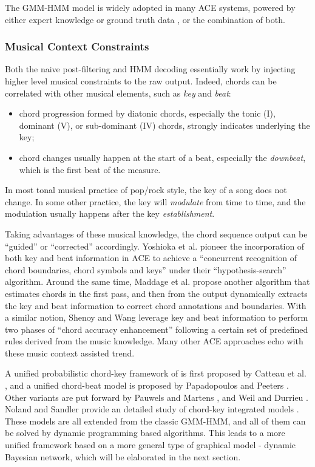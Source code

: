 The GMM-HMM model is widely adopted in many ACE systems, powered by either expert knowledge \cite{bello2005robust,weil2008hmm,cannam2013mirex} or ground truth data \cite{ellis20072007,lee2008acoustic,weil2009automatic,khadkevich2009use,mauch2008discrete,reed2009minimum,cho2009real}, or the combination of both.

\subsubsection{Musical Context Constraints}
Both the naive post-filtering and HMM decoding essentially work by injecting higher level musical constraints to the raw output. Indeed, chords can be correlated with other musical elements, such as {\it key} and {\it beat}:
\begin{itemize}
\item chord progression formed by diatonic chords, especially the tonic (I), dominant (V), or sub-dominant (IV) chords, strongly indicates underlying the key;
\item chord changes usually happen at the start of a beat, especially the {\it downbeat}, which is the first beat of the measure.
\end{itemize}
In most tonal musical practice of pop/rock style, the key of a song does not change. In some other practice, the key will {\it modulate} from time to time, and the modulation usually happens after the key {\it establishment}.

Taking advantages of these musical knowledge, the chord sequence output can be ``guided'' or ``corrected'' accordingly. Yoshioka et al. \cite{yoshioka2004automatic} pioneer the incorporation of both key and beat information in ACE to achieve a ``concurrent recognition of chord boundaries, chord symbols and keys'' under their ``hypothesis-search'' algorithm. Around the same time, Maddage et al. \cite{maddage2004content} propose another algorithm that estimates chords in the first pass, and then from the output dynamically extracts the key and beat information to correct chord annotations and boundaries. With a similar notion, Shenoy and Wang \cite{shenoy2005key} leverage key and beat information to perform two phases of ``chord accuracy enhancement'' following a certain set of predefined rules derived from the music knowledge. Many other ACE approaches \cite{lee2008acoustic,zenz2007automatic,sumi2008automatic,reinhard2008enhancing,khadkevich2011time} echo with these music context assisted trend.

A unified probabilistic chord-key framework of is first proposed by Catteau et al. \cite{catteau2007probabilistic}, and a unified chord-beat model is proposed by Papadopoulos and Peeters \cite{papadopoulos2008simultaneous}. Other variants are put forward by Pauwels and Martens \cite{pauwels2010integrating,pauwels2014combining}, and Weil and Durrieu \cite{weil2009automatic}. Noland and Sandler provide an detailed study of chord-key integrated models \cite{noland2009influences}. These models are all extended from the classic GMM-HMM, and all of them can be solved by dynamic programming based algorithms. This leads to a more unified framework based on a more general type of graphical model - dynamic Bayesian network, which will be elaborated in the next section.

